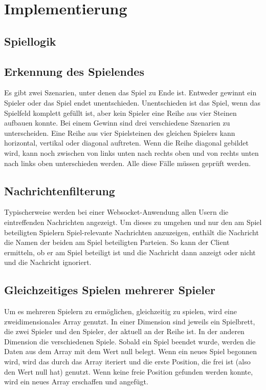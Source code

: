
\chapter{Implementierung}\label{cha:Implementierung}

\section{Spiellogik}\label{sec:Spiellogik}
\section{Erkennung des Spielendes}\label{sec:GameOver}
Es gibt zwei Szenarien, unter denen das Spiel zu Ende ist. Entweder gewinnt ein Spieler oder das Spiel endet unentschieden. Unentschieden ist das Spiel, wenn das Spielfeld komplett gefüllt ist, aber kein Spieler eine Reihe aus vier Steinen aufbauen konnte.
Bei einem Gewinn sind drei verschiedene Szenarien zu unterscheiden. Eine Reihe aus vier Spielsteinen des gleichen Spielers kann horizontal, vertikal oder diagonal auftreten. Wenn die Reihe diagonal gebildet wird, kann noch zwischen von links unten nach rechts oben und von rechts unten nach links oben unterschieden werden. Alle diese Fälle müssen geprüft werden.

\section{Nachrichtenfilterung}\label{sec:Nachrichtenfilter}
Typischerweise werden bei einer Websocket-Anwendung allen Usern die eintreffenden Nachrichten angezeigt. Um dieses zu umgehen und nur den am Spiel beteiligten Spielern Spiel-relevante Nachrichten anzuzeigen, enthält die Nachricht die Namen der beiden am Spiel beteiligten Parteien. So kann der Client ermitteln, ob er am Spiel beteiligt ist und die Nachricht dann anzeigt oder nicht und die Nachricht ignoriert. 

\section{Gleichzeitiges Spielen mehrerer Spieler}\label{sec:Multiplegames}
Um es mehreren Spielern zu ermöglichen, gleichzeitig zu spielen, wird eine zweidimensionales Array genutzt. In einer Dimension sind jeweils ein Spielbrett, die zwei Spieler und den Spieler, der aktuell an der Reihe ist. In der anderen Dimension die verschiedenen Spiele. Sobald ein Spiel beendet wurde, werden die Daten aus dem Array mit dem Wert null belegt. Wenn ein neues Spiel begonnen wird, wird das durch das Array iteriert und die erste Position, die frei ist (also den Wert null hat) genutzt. Wenn keine freie Position gefunden werden konnte, wird ein neues Array erschaffen und angefügt. 
